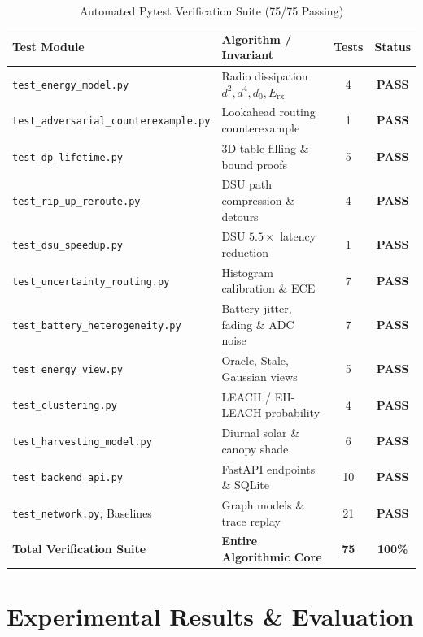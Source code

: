 \documentclass[conference]{IEEEtran}
\begin{document}
\begin{table}[!t]
\caption{Automated Pytest Verification Suite (75/75 Passing)}
\label{tab:pytest}
\centering
\begin{tabular}{@{}llcc@{}}
\toprule
\textbf{Test Module} & \textbf{Algorithm / Invariant} & \textbf{Tests} & \textbf{Status} \\
\midrule
\texttt{test\_energy\_model.py} & Radio dissipation $d^2, d^4, d_0, E_{\text{rx}}$ & 4 & \textbf{PASS} \\
\texttt{test\_adversarial\_counterexample.py} & Lookahead routing counterexample & 1 & \textbf{PASS} \\
\texttt{test\_dp\_lifetime.py} & 3D table filling \& bound proofs & 5 & \textbf{PASS} \\
\texttt{test\_rip\_up\_reroute.py} & DSU path compression \& detours & 4 & \textbf{PASS} \\
\texttt{test\_dsu\_speedup.py} & DSU $5.5\times$ latency reduction & 1 & \textbf{PASS} \\
\texttt{test\_uncertainty\_routing.py} & Histogram calibration \& ECE & 7 & \textbf{PASS} \\
\texttt{test\_battery\_heterogeneity.py} & Battery jitter, fading \& ADC noise & 7 & \textbf{PASS} \\
\texttt{test\_energy\_view.py} & Oracle, Stale, Gaussian views & 5 & \textbf{PASS} \\
\texttt{test\_clustering.py} & LEACH / EH-LEACH probability & 4 & \textbf{PASS} \\
\texttt{test\_harvesting\_model.py} & Diurnal solar \& canopy shade & 6 & \textbf{PASS} \\
\texttt{test\_backend\_api.py} & FastAPI endpoints \& SQLite & 10 & \textbf{PASS} \\
\texttt{test\_network.py}, Baselines & Graph models \& trace replay & 21 & \textbf{PASS} \\
\midrule
\textbf{Total Verification Suite} & \textbf{Entire Algorithmic Core} & \textbf{75} & \textbf{100\%} \\
\bottomrule
\end{tabular}
\end{table}

\section{Experimental Results \& Evaluation}
\end{document}
